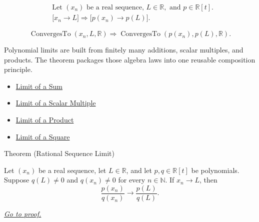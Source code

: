 \begin{remark*}
\[
\begin{aligned}
&\text{Let } (x_n) \text{ be a real sequence, } L\in\mathbb{R},
  \text{ and } p\in\mathbb{R}[t].\\
&\bigl[x_n\to L\bigr]
\Longrightarrow
\bigl[p(x_n)\to p(L)\bigr].
\end{aligned}
\]
\end{remark*}

\begin{remark*}
\[
\operatorname{ConvergesTo}(x_n,L,\mathbb{R})
\Longrightarrow
\operatorname{ConvergesTo}(p(x_n),p(L),\mathbb{R}).
\]
\end{remark*}

\begin{remark*}[Interpretation]
Polynomial limits are built from finitely many additions, scalar multiples,
and products. The theorem packages those algebra laws into one reusable
composition principle.
\end{remark*}

\begin{dependencies}
\begin{itemize}
  \item \hyperref[thm:limit-of-a-sum]{Limit of a Sum}
  \item \hyperref[thm:limit-of-scalar-multiple]{Limit of a Scalar Multiple}
  \item \hyperref[thm:limit-of-a-product]{Limit of a Product}
  \item \hyperref[thm:limit-of-a-square]{Limit of a Square}
\end{itemize}
\end{dependencies}


\begin{theorembox}{Theorem (Rational Sequence Limit)}
\begin{theorem}
\label{thm:rational-sequence-limit}
Let $(x_n)$ be a real sequence, let $L\in\mathbb{R}$, and let
$p,q\in\mathbb{R}[t]$ be polynomials. Suppose $q(L)\neq 0$ and
$q(x_n)\neq 0$ for every $n\in\mathbb{N}$. If $x_n\to L$, then
\[
\frac{p(x_n)}{q(x_n)}\to \frac{p(L)}{q(L)}.
\]

\smallskip
\noindent
\hyperref[prf:rational-sequence-limit]{\textit{Go to proof.}}
\end{theorem}
\end{theorembox}


